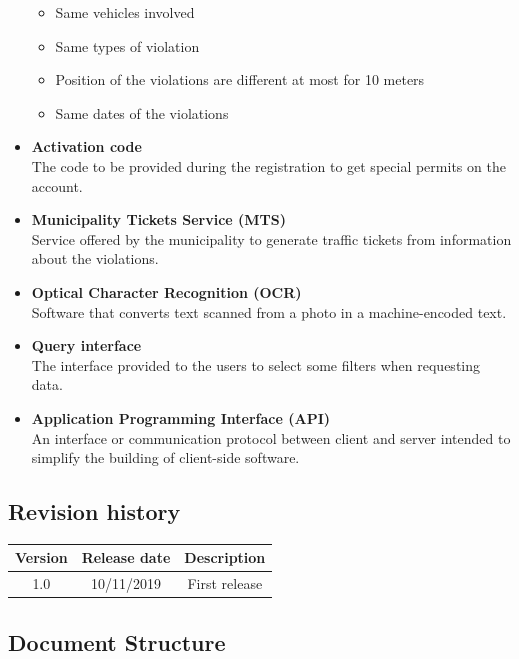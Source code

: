 \documentclass[a4paper]{article}
\begin{document}
\begin{itemize}
  \begin{itemize}
  \item
    Same vehicles involved
  \item
    Same types of violation
  \item
    Position of the violations are different at most for 10 meters
  \item
    Same dates of the violations
  \end{itemize}
\item
  \textbf{Activation code}\\
  The code to be provided during the registration to get special permits
  on the account.
\item
  \textbf{Municipality Tickets Service (MTS)}\\
  Service offered by the municipality to generate traffic tickets from
  information about the violations.
\item
  \textbf{Optical Character Recognition (OCR)}\\
  Software that converts text scanned from a photo in a machine-encoded
  text.
\item
  \textbf{Query interface}\\
  The interface provided to the users to select some filters when
  requesting data.
\item
  \textbf{Application Programming Interface (API)}\\
  An interface or communication protocol between client and server
  intended to simplify the building of client-side software.
\end{itemize}

\subsection{Revision history}

\begin{table}[H]
\centering
\begin{tabular}{|c|c|c|}
\hline
Version & Release date & Description\tabularnewline
\hline
1.0 & 10/11/2019 & First release\tabularnewline
\hline
\end{tabular}
\end{table}

\subsection{Document Structure}
\end{document}
